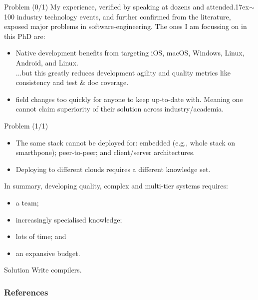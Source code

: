 \documentclass[aspectratio=169,xcolor={dvipsnames}]{beamer}
\begin{document}
	\begin{frame}{Problem (0/1)}
		My experience, verified by speaking at dozens and attended{\raise.17ex\hbox{$\scriptstyle\sim$}}100 industry technology events, and further confirmed from the literature, exposed major problems in software-engineering. The ones I am focussing on in this PhD are:
		\begin{itemize}
			\item Native development benefits from targeting iOS, macOS, Windows, Linux, Android, and Linux.\\
			\(\hdots\)but this greatly reduces development agility and quality metrics like consistency and test \& doc coverage.
			\item {} field changes too quickly for anyone to keep up-to-date with. Meaning one cannot claim superiority of their solution across industry/academia.
		\end{itemize}
	\end{frame}

	\begin{frame}{Problem (1/1)}
		\begin{itemize}
			\item The same stack cannot be deployed for: embedded (e.g., whole stack on smarthpone); peer-to-peer; and client/server architectures.
			\item Deploying to different clouds requires a different knowledge set.
		\end{itemize}
	    
		In summary, developing quality, complex and multi-tier systems requires:
		\begin{itemize}
			\item a team;
			\item increasingly specialised knowledge;
			\item lots of time; and
			\item an expansive budget.
		\end{itemize}
	\end{frame}

	\begin{frame}{Solution}
		Write compilers.
	\end{frame}
		
	\begin{frame}[t, allowframebreaks]
		\frametitle{References}
		
		
	\end{frame}
\end{document}
